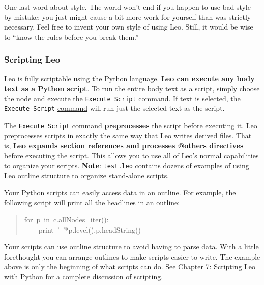 \documentclass[10pt,a4paper,english]{article}
\begin{document}
One last word about style. The world won't end if you happen to use bad style by
mistake: you just might cause a bit more work for yourself than was strictly
necessary. Feel free to invent your own style of using Leo. Still, it would be
wise to ``know the rules before you break them.''



\hypertarget{scripting-leo}{}
\subsubsection*{Scripting Leo}

Leo is fully scriptable using the Python language.
\textbf{Leo can execute any body text as a Python script}.
To run the entire body text as a script, simply choose the node and execute the \texttt{Execute Script} \href{commands.html}{command}.
If text is selected, the \texttt{Execute Script} \href{commands.html}{command} will run just the selected text as the script.

The \texttt{Execute Script} \href{commands.html}{command} \textbf{preprocesses} the script before executing it.
Leo preprocesses scripts in exactly the same way that Leo writes derived files.
That is,
\textbf{Leo expands section references and processes @others directives} before executing the script.
This allows you to use all of Leo's normal capabilities to organize your scripts.
\textbf{Note}: \texttt{test.leo} contains dozens of examples of using Leo outline structure to organize stand-alone scripts.

Your Python scripts can easily access data in an outline.  For example, the following script will print all the headlines in an outline:
\begin{quote}{\ttfamily \raggedright \noindent
for~p~in~c.allNodes{\_}iter():~\\
~~~~print~'~'*p.level(),p.headString()
}\end{quote}

Your scripts can use outline structure to avoid having to parse data.
With a little forethought you can arrange outlines to make scripts easier to write.
The example above is only the beginning of what scripts can do.
See \href{scripting.html}{Chapter 7: Scripting Leo with Python} for a complete discussion of scripting.


\end{document}
